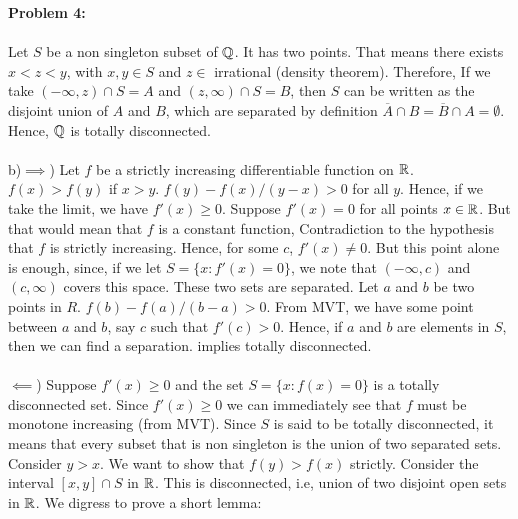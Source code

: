 \documentclass[../Main.tex]{subfiles}
\begin{document}
\newpage
\textbf{Problem 4:}
\\\\ Let $S$ be a non singleton subset of $\mathbb Q$. It has two points. That means there exists $x<z<y$, with $x,y \in S$ and $z \in $ irrational (density theorem). Therefore, If we take $(-\infty,z) \cap S=A$ and $(z,\infty) \cap S=B$, then $S$ can be written as the disjoint union of $A$ and $B$, which are separated by definition $\overline{A} \cap B= \overline{B} \cap A= \emptyset$. Hence, $\mathbb Q$ is totally disconnected.
\\\\ b)$\implies$) Let $f$ be a strictly increasing differentiable function on $\mathbb R$. $f(x)>f(y)$ if $x>y$. $f(y)-f(x)/(y-x) > 0$ for all $y$. Hence, if we take the limit, we have $f'(x) \geq 0$. Suppose $f'(x)=0$ for all points $x \in \mathbb R$. But that would mean that $f$ is a constant function, Contradiction to the hypothesis that $f$ is strictly increasing. Hence, for some $c$, $f'(x)\neq 0$. But this point alone is enough, since, if we let $S=\{x: f'(x)=0\}$, we note that $(-\infty,c)$ and $(c,\infty)$ covers this space. These two sets are separated. Let $a$ and $b$ be two points in $R$. $f(b)-f(a)/(b-a)>0$. From MVT, we have some point between $a$ and $b$, say $c$ such that $f'(c)>0$. Hence, if $a$ and $b$ are elements in $S$, then we can find a separation. implies totally disconnected.
\\\\ $\impliedby$) Suppose $f'(x) \geq 0$ and the set $S=\{x: f(x)=0\}$ is a totally disconnected set. Since $f'(x) \geq 0$ we can immediately see that $f$ must be monotone increasing (from MVT). Since $S$ is said to be totally disconnected, it means that every subset that is non singleton is the union of two separated sets. Consider $y>x$. We want to show that $f(y)>f(x)$ strictly. Consider the interval $[x,y] \cap S$ in $\mathbb R$. This is disconnected, i.e, union of two disjoint open sets in $\mathbb R$. We digress to prove a short lemma:
\end{document}
